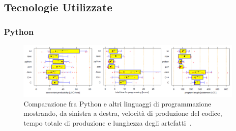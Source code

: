 \subsection{Tecnologie Utilizzate}

\subsubsection{Python}

\begin{figure}[h]
\centering
\includegraphics[viewport=0 0 1434 347, width=1\textwidth]{Immagini/Capitolo3/Python-comparison.pdf}
\caption[Comparazione fra Python e altri linguaggi di programmazione]{Comparazione fra Python e altri linguaggi di programmazione mostrando, da sinistra a destra, velocità di produzione del codice, tempo totale di produzione e lunghezza degli artefatti~\cite{prechelt2000}.}\label{fig:python-comparison}
\end{figure}

